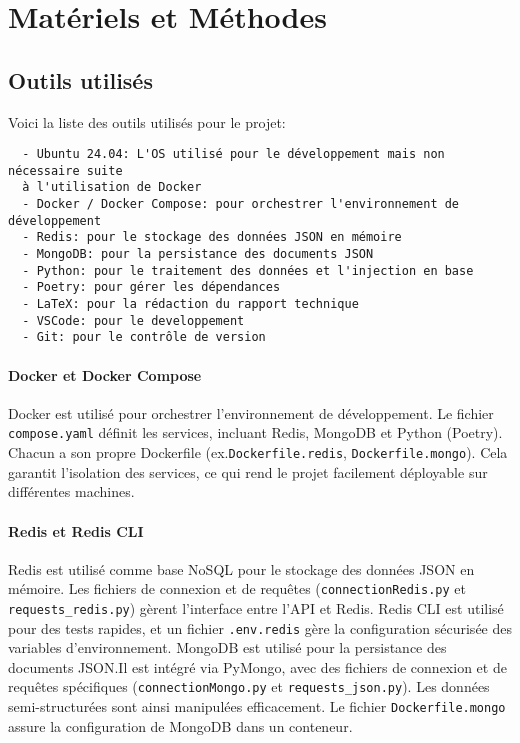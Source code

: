 \chapter{Matériels et Méthodes}
\section{Outils utilisés}

Voici la liste des outils utilisés pour le projet:
\begin{verbatim}
  - Ubuntu 24.04: L'OS utilisé pour le développement mais non nécessaire suite 
  à l'utilisation de Docker
  - Docker / Docker Compose: pour orchestrer l'environnement de développement
  - Redis: pour le stockage des données JSON en mémoire
  - MongoDB: pour la persistance des documents JSON
  - Python: pour le traitement des données et l'injection en base
  - Poetry: pour gérer les dépendances
  - LaTeX: pour la rédaction du rapport technique
  - VSCode: pour le developpement
  - Git: pour le contrôle de version
\end{verbatim}  
  

\subsubsection{Docker et Docker Compose}
Docker est utilisé pour orchestrer l’environnement de développement. 
Le fichier \texttt{compose.yaml} définit les services, incluant 
Redis, MongoDB et Python (Poetry). Chacun a son propre Dockerfile 
(ex.\@ \texttt{Dockerfile.redis}, \texttt{Dockerfile.mongo}). 
Cela garantit l’isolation des services, ce qui rend le projet facilement 
déployable sur différentes machines.

\subsubsection{Redis et Redis CLI}
Redis est utilisé comme base NoSQL pour le stockage des données JSON en mémoire. Les fichiers de connexion et de requêtes (\texttt{connectionRedis.py} et \texttt{requests\_redis.py}) gèrent l’interface entre l’API et Redis. Redis CLI est utilisé pour des tests rapides, et un fichier \texttt{.env.redis} gère la configuration sécurisée des variables d'environnement.
MongoDB est utilisé pour la persistance des documents JSON.\@ Il est intégré via PyMongo, avec des fichiers de connexion et de requêtes spécifiques (\texttt{connectionMongo.py} et \texttt{requests\_json.py}). Les données semi-structurées sont ainsi manipulées efficacement. Le fichier \texttt{Dockerfile.mongo} assure la configuration de MongoDB dans un conteneur.

